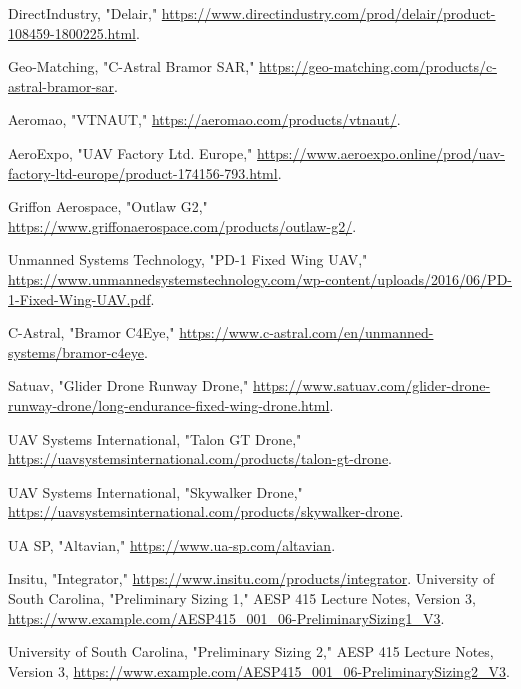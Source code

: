 \documentclass[12pt]{article}
\begin{document}
\begin{thebibliography}{99}
				DirectIndustry, "Delair," \url{https://www.directindustry.com/prod/delair/product-108459-1800225.html}.
				
				Geo-Matching, "C-Astral Bramor SAR," \url{https://geo-matching.com/products/c-astral-bramor-sar}.
				
				Aeromao, "VTNAUT," \url{https://aeromao.com/products/vtnaut/}.
				
				AeroExpo, "UAV Factory Ltd. Europe," \url{https://www.aeroexpo.online/prod/uav-factory-ltd-europe/product-174156-793.html}.
				
				Griffon Aerospace, "Outlaw G2," \url{https://www.griffonaerospace.com/products/outlaw-g2/}.
				
				Unmanned Systems Technology, "PD-1 Fixed Wing UAV," \url{https://www.unmannedsystemstechnology.com/wp-content/uploads/2016/06/PD-1-Fixed-Wing-UAV.pdf}.
				
				C-Astral, "Bramor C4Eye," \url{https://www.c-astral.com/en/unmanned-systems/bramor-c4eye}.
				
				Satuav, "Glider Drone Runway Drone," \url{https://www.satuav.com/glider-drone-runway-drone/long-endurance-fixed-wing-drone.html}.
				
				UAV Systems International, "Talon GT Drone," \url{https://uavsystemsinternational.com/products/talon-gt-drone}.
				
				UAV Systems International, "Skywalker Drone," \url{https://uavsystemsinternational.com/products/skywalker-drone}.
				
				UA SP, "Altavian," \url{https://www.ua-sp.com/altavian}.
				
				Insitu, "Integrator," \url{https://www.insitu.com/products/integrator}.
				University of South Carolina, "Preliminary Sizing 1," AESP 415 Lecture Notes, Version 3, \url{https://www.example.com/AESP415_001_06-PreliminarySizing1_V3}.
				
				University of South Carolina, "Preliminary Sizing 2," AESP 415 Lecture Notes, Version 3, \url{https://www.example.com/AESP415_001_06-PreliminarySizing2_V3}.
				
				
				
							
			
		\end{thebibliography}
		
\end{document}
